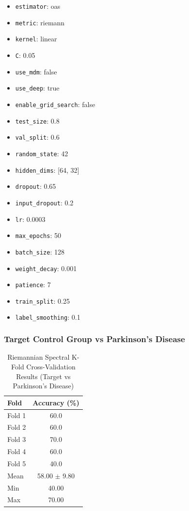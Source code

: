 \documentclass[12pt]{report}
\begin{document}
\begin{itemize}
    \item \texttt{estimator}: oas
    \item \texttt{metric}: riemann
    \item \texttt{kernel}: linear
    \item \texttt{C}: 0.05
    \item \texttt{use\_mdm}: false
    \item \texttt{use\_deep}: true
    \item \texttt{enable\_grid\_search}: false
    \item \texttt{test\_size}: 0.8
    \item \texttt{val\_split}: 0.6
    \item \texttt{random\_state}: 42
    \item \texttt{hidden\_dims}: [64, 32]
    \item \texttt{dropout}: 0.65
    \item \texttt{input\_dropout}: 0.2
    \item \texttt{lr}: 0.0003
    \item \texttt{max\_epochs}: 50
    \item \texttt{batch\_size}: 128
    \item \texttt{weight\_decay}: 0.001
    \item \texttt{patience}: 7
    \item \texttt{train\_split}: 0.25
    \item \texttt{label\_smoothing}: 0.1
\end{itemize}

\subsubsection{Target Control Group vs Parkinson's Disease}

\begin{table}[h]
\centering
\caption{Riemannian Spectral K-Fold Cross-Validation Results (Target vs Parkinson's Disease)}
\begin{tabular}{lc}
\hline
\textbf{Fold} & \textbf{Accuracy (\%)} \\
\hline
Fold 1 & 60.0 \\
Fold 2 & 60.0 \\
Fold 3 & 70.0 \\
Fold 4 & 60.0 \\
Fold 5 & 40.0 \\
\hline
Mean & 58.00 $\pm$ 9.80 \\
Min & 40.00 \\
Max & 70.00 \\
\hline
\end{tabular}
\end{table}
\end{document}
